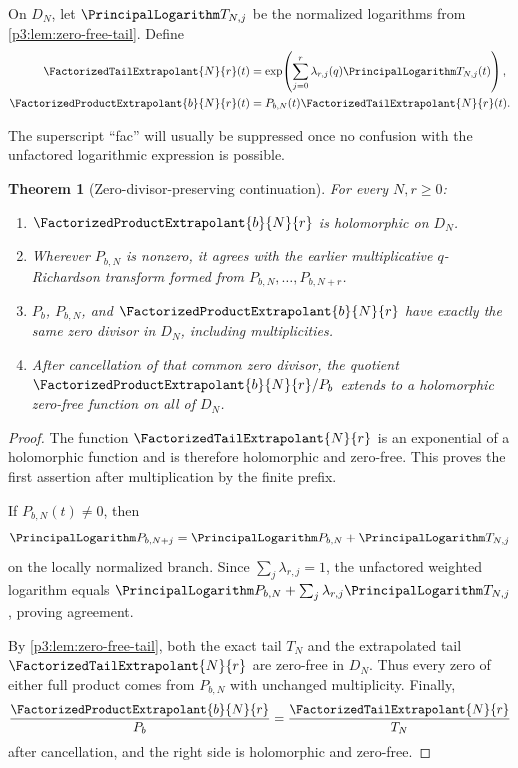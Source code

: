 \documentclass[11pt]{article}
\numberwithin{equation}{section}
\newtheorem{theorem}{Theorem}[section]
\theoremstyle{definition}
\theoremstyle{remark}
\begin{document}
\begin{definition}\label{p3:def:factorized}
On $D_N$, let $\PrincipalLogarithm T_{N,j}$ be the normalized logarithms from
\cref{p3:lem:zero-free-tail}.  Define
\begin{align}
 \FactorizedTailExtrapolant{N}{r}(t)
   &=\exp\!\left(\sum_{j=0}^{r}\lambda_{r,j}(q)\PrincipalLogarithm T_{N,j}(t)\right),
 \label{p3:eq:hat-tail}\\
 \FactorizedProductExtrapolant{b}{N}{r}(t)
   &=P_{b,N}(t)\FactorizedTailExtrapolant{N}{r}(t).
 \label{p3:eq:hat-factorized}
\end{align}
\end{definition}

The superscript ``fac'' will usually be suppressed once no confusion with the unfactored
logarithmic expression is possible.

\begin{theorem}[Zero-divisor-preserving continuation]\label{p3:thm:zero-preserving}
For every $N,r\ge0$:
\begin{enumerate}
\item $\FactorizedProductExtrapolant{b}{N}{r}$ is holomorphic on $D_N$.
\item Wherever $P_{b,N}$ is nonzero, it agrees with the earlier multiplicative
      $q$-Richardson transform formed from $P_{b,N},\ldots,P_{b,N+r}$.
\item $P_b$, $P_{b,N}$, and $\FactorizedProductExtrapolant{b}{N}{r}$ have exactly the same zero
      divisor in $D_N$, including multiplicities.
\item After cancellation of that common zero divisor, the quotient
      $\FactorizedProductExtrapolant{b}{N}{r}/P_b$ extends to a holomorphic zero-free function on
      all of $D_N$.
\end{enumerate}
\end{theorem}

\begin{proof}
The function $\FactorizedTailExtrapolant{N}{r}$ is an exponential of a holomorphic function and is therefore
holomorphic and zero-free.  This proves the first assertion after multiplication by the
finite prefix.

If $P_{b,N}(t)\ne0$, then
\[
 \PrincipalLogarithm P_{b,N+j}=\PrincipalLogarithm P_{b,N}+\PrincipalLogarithm T_{N,j}
\]
on the locally normalized branch.  Since $\sum_j\lambda_{r,j}=1$, the unfactored weighted
logarithm equals $\PrincipalLogarithm P_{b,N}+\sum_j\lambda_{r,j}\PrincipalLogarithm T_{N,j}$, proving agreement.

By \cref{p3:lem:zero-free-tail}, both the exact tail $T_N$ and the extrapolated tail
$\FactorizedTailExtrapolant{N}{r}$ are zero-free in $D_N$.  Thus every zero of either full product comes
from $P_{b,N}$ with unchanged multiplicity.  Finally,
\[
 \frac{\FactorizedProductExtrapolant{b}{N}{r}}{P_b}
 =\frac{\FactorizedTailExtrapolant{N}{r}}{T_N}
\]
after cancellation, and the right side is holomorphic and zero-free.
\end{proof}
\end{document}
